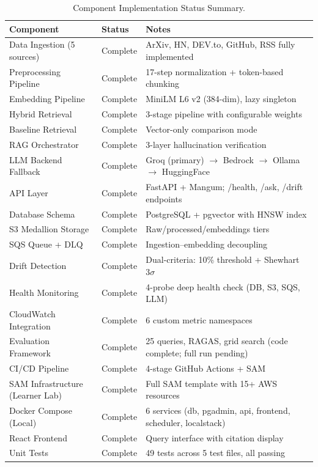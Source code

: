 \documentclass[12pt,a4paper]{report}
\begin{document}
\begin{table}[H]
\caption{Component Implementation Status Summary.}
\label{tab:impl_status}
\centering
\begin{tabular}{p{4.5cm}p{2.0cm}p{6.0cm}}
\toprule
\textbf{Component} & \textbf{Status} & \textbf{Notes} \\
\midrule
Data Ingestion (5 sources) & Complete & ArXiv, HN, DEV.to, GitHub, RSS fully implemented \\
Preprocessing Pipeline & Complete & 17-step normalization + token-based chunking \\
Embedding Pipeline & Complete & MiniLM L6 v2 (384-dim), lazy singleton \\
Hybrid Retrieval & Complete & 3-stage pipeline with configurable weights \\
Baseline Retrieval & Complete & Vector-only comparison mode \\
RAG Orchestrator & Complete & 3-layer hallucination verification \\
LLM Backend Fallback & Complete & Groq (primary) $\to$ Bedrock $\to$ Ollama $\to$ HuggingFace \\
API Layer & Complete & FastAPI + Mangum; /health, /ask, /drift endpoints \\
Database Schema & Complete & PostgreSQL + pgvector with HNSW index \\
S3 Medallion Storage & Complete & Raw/processed/embeddings tiers \\
SQS Queue + DLQ & Complete & Ingestion--embedding decoupling \\
Drift Detection & Complete & Dual-criteria: 10\% threshold + Shewhart $3\sigma$ \\
Health Monitoring & Complete & 4-probe deep health check (DB, S3, SQS, LLM) \\
CloudWatch Integration & Complete & 6 custom metric namespaces \\
Evaluation Framework & Complete & 25 queries, RAGAS, grid search (code complete; full run pending) \\
CI/CD Pipeline & Complete & 4-stage GitHub Actions + SAM \\
SAM Infrastructure (Learner Lab) & Complete & Full SAM template with 15+ AWS resources \\
Docker Compose (Local) & Complete & 6 services (db, pgadmin, api, frontend, scheduler, localstack) \\
React Frontend & Complete & Query interface with citation display \\
Unit Tests & Complete & 49 tests across 5 test files, all passing \\
\bottomrule
\end{tabular}
\end{table}
\end{document}
